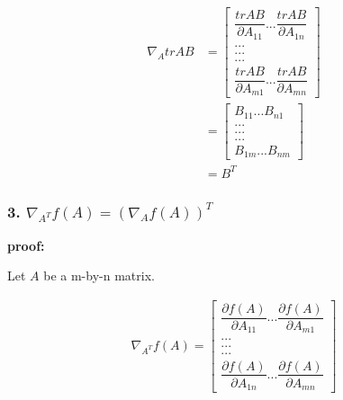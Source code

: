 \begin{equation}
\begin{split}
  \nabla_A trAB &=
  \begin{bmatrix}
    \dfrac{trAB}{\partial A_{11}} ... \dfrac{trAB}{\partial A_{1n}}\\
    . .   .\\
    .  .  .\\
    .   . .\\
    \dfrac{trAB}{\partial A_{m1}} ... \dfrac{trAB}{\partial A_{mn}}
  \end{bmatrix} \\
  &=
  \begin{bmatrix}
    B_{11} ... B_{n1}\\
    . .   .\\
    .  .  .\\
    .   . .\\
    B_{1m} ... B_{nm}
  \end{bmatrix} \\
  &= B^T
\end{split}
\end{equation}

\subsubsection {3. $\nabla_{A^{T}}f(A) = (\nabla_{A}f(A))^T$}

\textbf{proof:}

Let $A$ be a m-by-n matrix.

\begin{equation}
\begin{split}
  \nabla_{A^{T}}f(A) =
  \begin{bmatrix}
    \dfrac{\partial f(A)}{\partial A_{11}} ... \dfrac{\partial f(A)}{\partial A_{m1}} \\
    . .   .\\
    .  .  .\\
    .   . .\\
    \dfrac{\partial f(A)}{\partial A_{1n}} ... \dfrac{\partial f(A)}{\partial A_{mn}}
  \end{bmatrix} \\
\end{split}
\end{equation}

